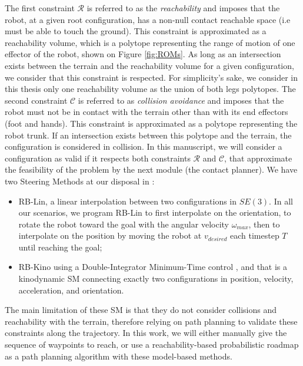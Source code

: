 The first constraint $\mathcal{R}$ is referred to as the \textit{reachability} and imposes that the robot, at a given root configuration, has a non-null contact reachable space (i.e must be able to touch the ground). 
This constraint is approximated as a reachability volume, which is a polytope representing the range of motion of one effector of the robot, shown on Figure \ref{fig:ROMs}.
As long as an intersection exists between the terrain and the reachability volume for a given configuration, we consider that this constraint is respected.
For simplicity's sake, we consider in this thesis only one reachability volume as the union of both legs polytopes.
The second constraint $\mathcal{C}$ is referred to as \textit{collision avoidance} and imposes that the robot must not be in contact with the terrain other than with its end effectors (foot and hands). This constraint is approximated as a polytope representing the robot trunk. If an intersection exists between this polytope and the terrain, the configuration is considered in collision.
In this manuscript, we will consider a configuration as valid if it respects both constraints $\mathcal{R}$ and $\mathcal{C}$, that approximate the feasibility of the problem by the next module (the contact planner).
We have two Steering Methods at our disposal in \cite{loco3d}:
\begin{itemize}
    \item RB-Lin, a linear interpolation between two configurations in $SE(3)$. In all our scenarios, we program RB-Lin to first interpolate on the orientation, to rotate the robot toward the goal with the angular velocity $\omega_{max}$, then to interpolate on the position by moving the robot at $v_{desired}$ each timestep $T$ until reaching the goal;
    \item RB-Kino \cite{kinodynamic_sm_2017} using a Double-Integrator Minimum-Time control \cite{DIMT}, and that is a kinodynamic SM connecting exactly two configurations in position, velocity, acceleration, and orientation.
\end{itemize}
The main limitation of these SM is that they do not consider collisions and reachability with the terrain, therefore relying on path planning to validate these constraints along the trajectory.
In this work, we will either manually give the sequence of waypoints to reach, or use a reachability-based probabilistic roadmap \cite{RB-PRM} as a path planning algorithm with these model-based methods. 

